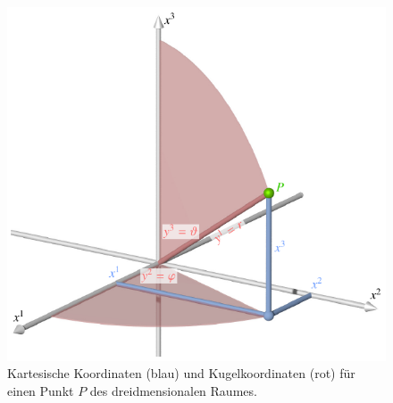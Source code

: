 %
%
%
\begin{figure}
\centering
\includegraphics{chapters/020-koordinaten/images/kartkugel.pdf}
\caption{Kartesische Koordinaten ({\color{blue}blau}) und Kugelkoordinaten
({\color{darkred}rot}) für einen Punkt $P$ des dreidmensionalen Raumes.
\label{buch:koordinaten:koordinaten:fig:kartkugel}}
\end{figure}
